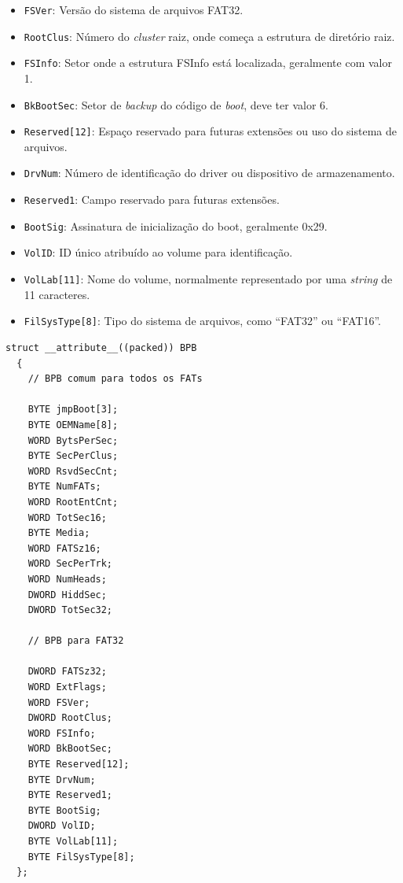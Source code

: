 \documentclass[
    12pt,				%
    oneside,   	        %
    a4paper,			%
    english,			%
    french,				%
    spanish,			%
    brazil,				%
    ]{pacotes/abntex2}
\begin{document}
\begin{itemize}
\begin{itemize}
            \item \texttt{FSVer}: Versão do sistema de arquivos FAT32.
            \item \texttt{RootClus}: Número do \textit{cluster} raiz, onde começa a estrutura de diretório raiz.
            \item \texttt{FSInfo}: Setor onde a estrutura FSInfo está localizada, geralmente com valor 1.
            \item \texttt{BkBootSec}: Setor de \textit{backup} do código de \textit{boot}, deve ter valor 6.
            \item \texttt{Reserved[12]}: Espaço reservado para futuras extensões ou uso do sistema de arquivos.
            \item \texttt{DrvNum}: Número de identificação do driver ou dispositivo de armazenamento.
            \item \texttt{Reserved1}: Campo reservado para futuras extensões.
            \item \texttt{BootSig}: Assinatura de inicialização do boot, geralmente 0x29.
            \item \texttt{VolID}: ID único atribuído ao volume para identificação.
            \item \texttt{VolLab[11]}: Nome do volume, normalmente representado por uma \textit{string} de 11 caracteres.
            \item \texttt{FilSysType[8]}: Tipo do sistema de arquivos, como ``FAT32'' ou ``FAT16''.
        \end{itemize}
\end{itemize}

\begin{lstlisting}[caption={Estrutura que representa o BPB encontrado no volume FAT}, label={lst:bpb}]
  struct __attribute__((packed)) BPB
  {
    // BPB comum para todos os FATs
    
    BYTE jmpBoot[3];
    BYTE OEMName[8];
    WORD BytsPerSec;
    BYTE SecPerClus;
    WORD RsvdSecCnt;
    BYTE NumFATs;
    WORD RootEntCnt;
    WORD TotSec16;
    BYTE Media;
    WORD FATSz16;
    WORD SecPerTrk;
    WORD NumHeads;
    DWORD HiddSec;
    DWORD TotSec32;
    
    // BPB para FAT32

    DWORD FATSz32;
    WORD ExtFlags;
    WORD FSVer;
    DWORD RootClus;
    WORD FSInfo;
    WORD BkBootSec;
    BYTE Reserved[12];
    BYTE DrvNum;
    BYTE Reserved1;
    BYTE BootSig;
    DWORD VolID;
    BYTE VolLab[11];
    BYTE FilSysType[8];
  };
\end{lstlisting}
\end{document}
